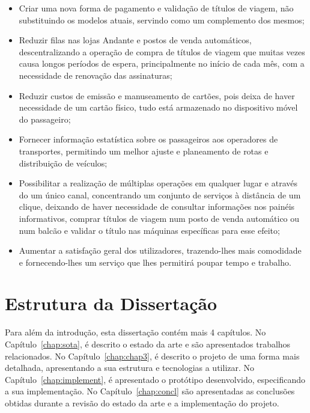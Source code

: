 \begin{itemize}
\item Criar uma nova forma de pagamento e validação de títulos de viagem, não substituindo os modelos atuais, servindo como um complemento dos mesmos;
\item Reduzir filas nas lojas Andante e postos de venda automáticos, descentralizando a operação de compra de títulos de viagem que muitas vezes causa longos períodos de espera, principalmente no início de cada mês, com a necessidade de renovação das assinaturas;
\item Reduzir custos de emissão e manuseamento de cartões, pois deixa de haver necessidade de um cartão físico, tudo está armazenado no dispositivo móvel do passageiro;
\item Fornecer informação estatística sobre os passageiros aos operadores de transportes, permitindo um melhor ajuste e planeamento de rotas e distribuição de veículos;
\item Possibilitar a realização de múltiplas operações em qualquer lugar e através do um único canal, concentrando um conjunto de serviços à distância de um clique, deixando de haver necessidade de consultar informações nos painéis informativos, comprar títulos de viagem num posto de venda automático ou num balcão e validar o título nas máquinas específicas para esse efeito;
\item Aumentar a satisfação geral dos utilizadores, trazendo-lhes mais comodidade e fornecendo-lhes um serviço que lhes permitirá poupar tempo e trabalho.
\end{itemize}

\section{Estrutura da Dissertação} \label{sec:struct}

Para além da introdução, esta dissertação contém mais 4 capítulos.
No Capítulo~\ref{chap:sota}, é descrito o estado da arte e são apresentados trabalhos relacionados. 
No Capítulo~\ref{chap:chap3}, é descrito o projeto de uma forma mais detalhada, apresentando a sua estrutura e tecnologias a utilizar.
No Capítulo~\ref{chap:implement}, é apresentado o protótipo desenvolvido, especificando a sua implementação.
No Capítulo~\ref{chap:concl} são apresentadas as conclusões obtidas durante a revisão do estado da arte e a implementação do projeto.